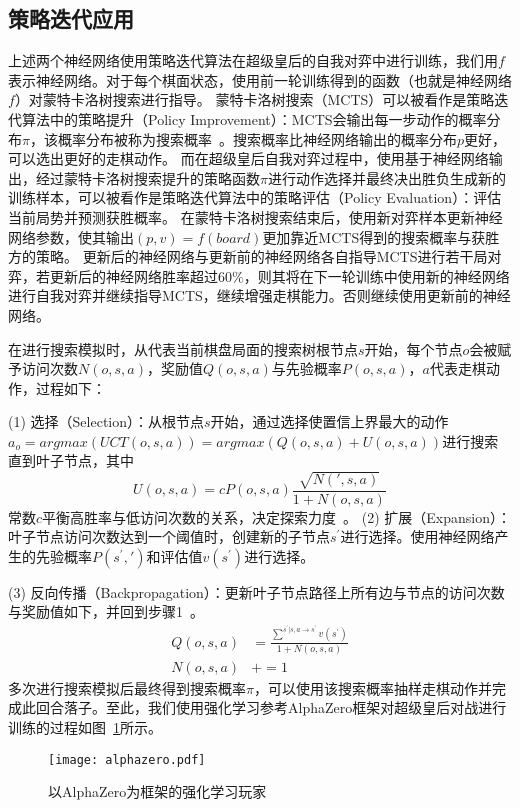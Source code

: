 \subsection{策略迭代应用}
上述两个神经网络使用策略迭代算法在超级皇后的自我对弈中进行训练，我们用$f$表示神经网络。对于每个棋面状态，使用前一轮训练得到的函数（也就是神经网络$f$）对蒙特卡洛树搜索进行指导。
蒙特卡洛树搜索（MCTS）可以被看作是策略迭代算法中的策略提升（Policy Improvement）：MCTS会输出每一步动作的概率分布$\pi$，该概率分布被称为搜索概率~\cite{silver2009reinforcement}。搜索概率比神经网络输出的概率分布$p$更好，可以选出更好的走棋动作。
而在超级皇后自我对弈过程中，使用基于神经网络输出，经过蒙特卡洛树搜索提升的策略函数$\pi$进行动作选择并最终决出胜负生成新的训练样本，可以被看作是策略迭代算法中的策略评估（Policy Evaluation）：评估当前局势并预测获胜概率。
在蒙特卡洛树搜索结束后，使用新对弈样本更新神经网络参数，使其输出$(p,v)=f(board)$更加靠近MCTS得到的搜索概率与获胜方的策略。
更新后的神经网络与更新前的神经网络各自指导MCTS进行若干局对弈，若更新后的神经网络胜率超过$60\%$，则其将在下一轮训练中使用新的神经网络进行自我对弈并继续指导MCTS，继续增强走棋能力。否则继续使用更新前的神经网络。

在进行搜索模拟时，从代表当前棋盘局面的搜索树根节点$s$开始，每个节点$o$会被赋予访问次数$N(o,s,a)$，奖励值$Q(o,s,a)$与先验概率$P(o,s,a)$，$a$代表走棋动作，过程如下：

(1) 选择（Selection）：从根节点$s$开始，通过选择使置信上界最大的动作$a_{o} = argmax(UCT(o,s,a)) = argmax(Q(o,s,a) + U(o,s,a))$进行搜索直到叶子节点，其中
\begin{equation}
    U(o,s,a) = cP(o,s,a)\frac{\sqrt{N(\prime,s,a)}}{1+N(o,s,a)}
\end{equation}
常数$c$平衡高胜率与低访问次数的关系，决定探索力度~\cite{rosin2011multi}。
(2) 扩展（Expansion）：叶子节点访问次数达到一个阈值时，创建新的子节点$s^{\prime}$进行选择。使用神经网络产生的先验概率$P(s^{\prime},\prime)$和评估值$v(s^{\prime})$进行选择。

(3) 反向传播（Backpropagation）：更新叶子节点路径上所有边与节点的访问次数与奖励值如下，并回到步骤1~\cite{segal2010scalability}。
\begin{equation}
    \begin{aligned}
    Q(o,s,a) &= \frac{\sum^{s^{\prime}|s,a\rightarrow s^{\prime}}v(s^{\prime})}{1+N(o,s,a)} \\
    N(o,s,a) &+= 1 
    \end{aligned}
\end{equation}
多次进行搜索模拟后最终得到搜索概率$\pi$，可以使用该搜索概率抽样走棋动作并完成此回合落子。至此，我们使用强化学习参考AlphaZero框架对超级皇后对战进行训练的过程如图~\ref{fig:az}所示。
\begin{figure}[H]
    \centering
    \texttt{[image: alphazero.pdf]}
    \caption[az]{%
    以AlphaZero为框架的强化学习玩家~\cite{Silver2017}%
      }
    \label{fig:az}
\end{figure}


